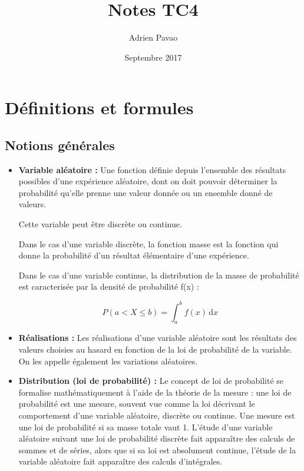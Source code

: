 \documentclass{article}
\title{Notes TC4}
\author{Adrien Pavao}
\date{Septembre 2017}
\begin{document}
\maketitle

\tableofcontents

\section{Définitions et formules}

\subsection{Notions générales}

\begin{itemize}
\item \textbf{Variable aléatoire :} Une fonction définie depuis l'ensemble des résultats possibles d'une expérience aléatoire, dont on doit pouvoir déterminer la probabilité qu'elle prenne une valeur donnée ou un ensemble donné de valeurs. 

Cette variable peut être discrète ou continue.

Dans le cas d'une variable discrète, la fonction masse est la fonction qui donne la probabilité d'un résultat élémentaire d'une expérience.

Dans le cas d'une variable continue, la distribution de la masse de probabilité est caracterisée par la densité de probabilité f(x) : 

\[ P(a < X \leq b)  = \displaystyle \int_{a}^{b} f(x) \, \mathrm{d}x \]

\item \textbf{Réalisations :} Les réalisations d'une variable aléatoire sont les résultats des valeurs choisies au hasard en fonction de la loi de probabilité de la variable. On les appelle également les variations aléatoires.

\item \textbf{Distribution (loi de probabilité) :} Le concept de loi de probabilité se formalise mathématiquement à l'aide de la théorie de la mesure : une loi de probabilité est une mesure, souvent vue comme la loi décrivant le comportement d'une variable aléatoire, discrète ou continue. Une mesure est une loi de probabilité si sa masse totale vaut 1. L'étude d'une variable aléatoire suivant une loi de probabilité discrète fait apparaître des calculs de sommes et de séries, alors que si sa loi est absolument continue, l'étude de la variable aléatoire fait apparaître des calculs d'intégrales.


\end{itemize}
\end{document}

